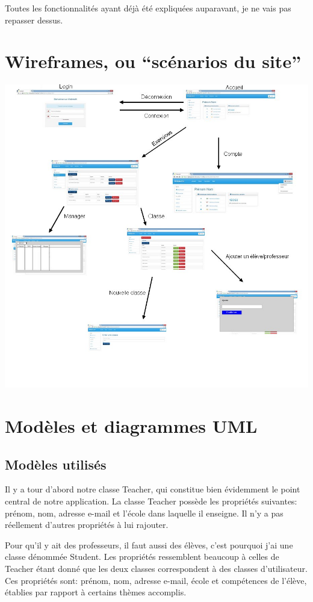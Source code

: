 \documentclass[letterpaper,10pt,french]{sphinxmanual}
\begin{document}
Toutes les fonctionnalités ayant déjà été expliquées auparavant, je ne vais pas
repasser dessus.


\section{Wireframes, ou ``scénarios du site''}
\label{documentation:wireframes-ou-scenarios-du-site}
\includegraphics{wf.jpg}


\section{Modèles et diagrammes UML}
\label{documentation:modeles-et-diagrammes-uml}

\subsection{Modèles utilisés}
\label{documentation:modeles-utilises}
Il y a tour d'abord notre classe Teacher, qui constitue bien évidemment le
point central de notre application. La classe Teacher possède les propriétés
suivantes: prénom, nom, adresse e-mail et l'école dans laquelle il enseigne.
Il n'y a pas réellement d'autres propriétés à lui rajouter.

Pour qu'il y ait des professeurs, il faut aussi des élèves, c'est pourquoi
j'ai une classe dénommée Student. Les propriétés ressemblent beaucoup à celles
de Teacher étant donné que les deux classes correspondent à des classes
d'utilisateur. Ces propriétés sont: prénom, nom, adresse e-mail, école et
compétences de l'élève, établies par rapport à certains thèmes accomplis.
\end{document}
